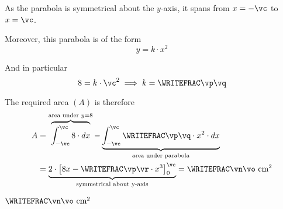 \MULTIPLY\vb\vc\vi
\FRACMULT\vp\vr{}\vj\vk
\FRACMINUS{}\vj\vk\vl\vm
\FRACMULT\vl{}\vn\vo

\begin{solution}[\halfpage]
  As the parabola is symmetrical about the $y$-axis, it spans from $x=-\vc$ to $x=\vc$.

  Moreover, this parabola is of the form 
    \[ y = k\cdot x^2 \]

  And in particular 
    \[ \vb = k\cdot \vc^2 \implies k = \WRITEFRAC\vp\vq \] 

  The required area $(A)$ is therefore 
  \begin{align}
    A &= \overbrace{\int_{-\vc}^{\vc}\vb\cdot dx}^{\text{area under }y=\vb} 
    - \underbrace{\int_{-\vc}^{\vc}\WRITEFRAC\vp\vq\cdot x^2\cdot dx}_{\text{area under parabola}} \\
    &= \underbrace{2\cdot\left[ \vb x - \WRITEFRAC\vp\vr\cdot x^3 \right]_0^{\vc}}_{\text{symmetrical about y-axis}} 
    = \WRITEFRAC\vn\vo\text{ cm}^2
  \end{align}
\end{solution}

\ifprintanswers
  \begin{codex}
    $\WRITEFRAC\vn\vo\text{ cm}^2$ 
  \end{codex}
\fi

